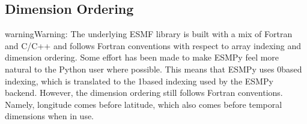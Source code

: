 \documentclass[letterpaper,10pt,english]{sphinxmanual}
\begin{document}
\subsection{Dimension Ordering}
\label{\detokenize{api:dimension-ordering}}
\begin{sphinxadmonition}{warning}{Warning:}
The underlying ESMF library is built with a mix of Fortran and C/C++
and follows Fortran conventions with respect to array indexing and
dimension ordering. Some effort has been made to make ESMPy feel more
natural to the Python user where possible. This means that ESMPy uses
0\sphinxhyphen{}based indexing, which is translated to the 1\sphinxhyphen{}based indexing used by
the ESMPy backend. However, the dimension ordering still follows
Fortran conventions. Namely, longitude comes before latitude, which
also comes before temporal dimensions when in use.

\begin{sphinxVerbatim}[commandchars=\\\{\}]
 \PYG{p}{[}\PYG{p}{]}    
     
      \PYG{p}{[}\PYG{p}{]} 
      
      
      
       
         
    \PYG{p}{[}\PYG{p}{]}  
    \PYG{p}{[}\PYG{p}{]}  


\end{sphinxVerbatim}
\end{sphinxadmonition}
\end{document}
